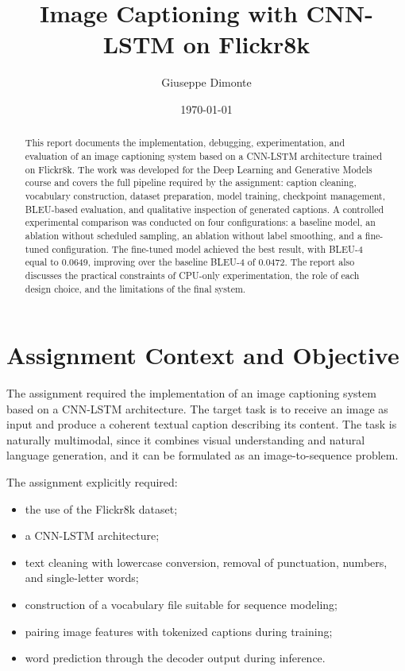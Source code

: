 \documentclass[11pt,a4paper]{article}
\title{Image Captioning with CNN-LSTM on Flickr8k}
\author{Giuseppe Dimonte}
\date{\today}
\begin{document}
\maketitle

\begin{abstract}
This report documents the implementation, debugging, experimentation, and evaluation of an image captioning system based on a CNN-LSTM architecture trained on Flickr8k. The work was developed for the Deep Learning and Generative Models course and covers the full pipeline required by the assignment: caption cleaning, vocabulary construction, dataset preparation, model training, checkpoint management, BLEU-based evaluation, and qualitative inspection of generated captions. A controlled experimental comparison was conducted on four configurations: a baseline model, an ablation without scheduled sampling, an ablation without label smoothing, and a fine-tuned configuration. The fine-tuned model achieved the best result, with BLEU-4 equal to 0.0649, improving over the baseline BLEU-4 of 0.0472. The report also discusses the practical constraints of CPU-only experimentation, the role of each design choice, and the limitations of the final system.
\end{abstract}

\tableofcontents
\newpage

\section{Assignment Context and Objective}

The assignment required the implementation of an image captioning system based on a CNN-LSTM architecture. The target task is to receive an image as input and produce a coherent textual caption describing its content. The task is naturally multimodal, since it combines visual understanding and natural language generation, and it can be formulated as an image-to-sequence problem.

The assignment explicitly required:
\begin{itemize}[leftmargin=*]
    \item the use of the Flickr8k dataset;
    \item a CNN-LSTM architecture;
    \item text cleaning with lowercase conversion, removal of punctuation, numbers, and single-letter words;
    \item construction of a vocabulary file suitable for sequence modeling;
    \item pairing image features with tokenized captions during training;
    \item word prediction through the decoder output during inference.
\end{itemize}
\end{document}
